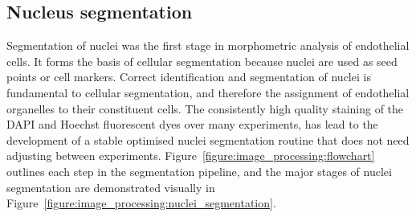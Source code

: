 \subsection{Nucleus segmentation}
\label{endothelial_morphometry:image_processing:nuclei}
Segmentation of nuclei was the first stage in morphometric analysis of endothelial cells. It forms the basis of cellular segmentation because nuclei are used as seed points or cell markers. Correct identification and segmentation of nuclei is fundamental to cellular segmentation, and therefore the assignment of endothelial organelles to their constituent cells. The consistently high quality staining of the DAPI and Hoechst fluorescent dyes over many experiments, has lead to the development of a stable optimised nuclei segmentation routine that does not need adjusting between experiments. Figure~\ref{figure:image_processing:flowchart} outlines each step in the segmentation pipeline, and the major stages of nuclei segmentation are demonstrated visually in Figure~\ref{figure:image_processing:nuclei_segmentation}.

